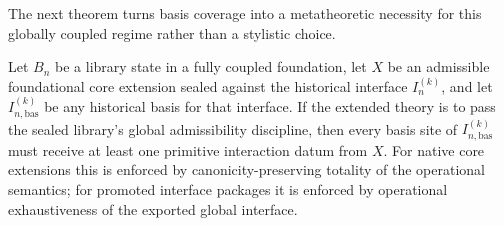 \documentclass{lmcs}
\begin{document}
The next theorem turns basis coverage into a metatheoretic necessity for this globally coupled
regime rather than a stylistic choice.

\begin{thm}
Let \(B_n\) be a library state in a fully coupled foundation, let \(X\) be an admissible
foundational core extension sealed against the historical interface \(I_n^{(k)}\), and let
\(I_{n,\mathrm{bas}}^{(k)}\) be any historical basis for that interface.  If the extended theory is
to pass the sealed library's global admissibility discipline, then every basis site of
\(I_{n,\mathrm{bas}}^{(k)}\) must receive at least one primitive interaction datum from \(X\).  For
native core extensions this is enforced by canonicity-preserving totality of the operational
semantics; for promoted interface packages it is enforced by operational exhaustiveness of
the exported global interface.
\end{thm}
\end{document}
